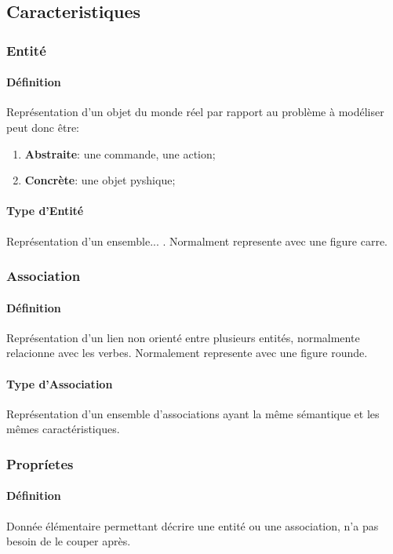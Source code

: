 \documentclass{article}
\begin{document}
\subsection{Caracteristiques}
\subsubsection{Entité}
\paragraph{Définition}Représentation d'un objet du monde réel par rapport au problème à modéliser peut donc être:
\begin{enumerate}
    \item \textbf{Abstraite}: une commande, une action;
    \item \textbf{Concrète}: une objet pyshique;
\end{enumerate}
\paragraph{Type d'Entité}Représentation d'un ensemble... . Normalment represente avec une figure carre.

\subsubsection{Association}
\paragraph{Définition}Représentation d'un lien non orienté entre plusieurs entités, normalmente relacionne avec les verbes. Normalement represente avec une figure rounde.

\paragraph{Type d'Association}Représentation d'un ensemble d'associations ayant la même sémantique et les mêmes caractéristiques.

\subsubsection{Propríetes}
\paragraph{Définition}Donnée élémentaire permettant décrire une entité ou une association, n'a pas besoin de le couper après.
\end{document}
